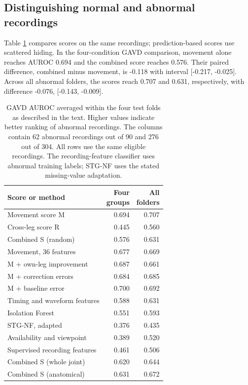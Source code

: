\documentclass[letterpaper]{article}
\begin{document}
\subsection{Distinguishing normal and abnormal recordings}

Table \ref{tab:detection} compares scores on the same recordings; prediction-based scores use scattered hiding. In the four-condition GAVD comparison, movement alone reaches AUROC 0.694 and the combined score reaches 0.576. Their paired difference, combined minus movement, is -0.118 with interval {[}-0.217, -0.025{]}. Across all abnormal folders, the scores reach 0.707 and 0.631, respectively, with difference -0.076, {[}-0.143, -0.009{]}.

\begin{table}[t]
\centering
\begin{tabular}{lrr}
\toprule
Score or method & \shortstack{Four\\groups} & \shortstack{All\\folders} \\
\midrule
Movement score M & 0.694 & 0.707 \\
Cross-leg score R & 0.445 & 0.560 \\
Combined S (random) & 0.576 & 0.631 \\
\addlinespace
Movement, 36 features & 0.677 & 0.669 \\
M + own-leg improvement & 0.687 & 0.661 \\
M + correction errors & 0.684 & 0.685 \\
M + baseline error & 0.700 & 0.692 \\
Timing and waveform features & 0.588 & 0.631 \\
Isolation Forest & 0.551 & 0.593 \\
STG-NF, adapted & 0.376 & 0.435 \\
Availability and viewpoint & 0.389 & 0.520 \\
Supervised recording features & 0.461 & 0.506 \\
\addlinespace
Combined S (whole joint) & 0.620 & 0.644 \\
Combined S (anatomical) & 0.631 & 0.672 \\
\bottomrule
\end{tabular}
\caption{GAVD AUROC averaged within the four test folds as described in the text. Higher values indicate better ranking of abnormal recordings. The columns contain 62 abnormal recordings out of 90 and 276 out of 304. All rows use the same eligible recordings. The recording-feature classifier uses abnormal training labels; STG-NF uses the stated missing-value adaptation.}
\label{tab:detection}
\end{table}
\end{document}
